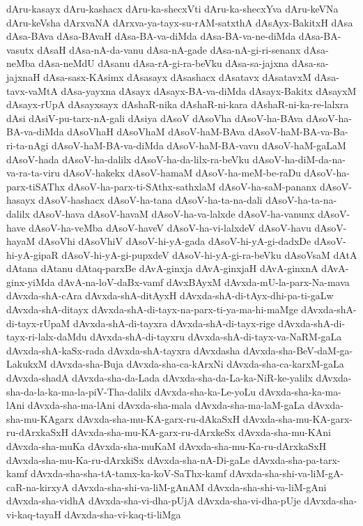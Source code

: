 {dAru-kasayx
dAru-kashacx
dAru-ka-shecxVti
dAru-ka-shecxYva
dAru-keVNa
dAru-keVsha
dArxvaNA
dArxva-ya-tayx-su-rAM-satxthA
dAsAyx-BakitxH
dAsa
dAsa-BAva
dAsa-BAvaH
dAsa-BA-va-diMda
dAsa-BA-va-ne-diMda
dAsa-BA-vasutx
dAsaH
dAsa-nA-da-vanu
dAsa-nA-gade
dAsa-nA-gi-ri-senanx
dAsa-neMba
dAsa-neMdU
dAsanu
dAsa-rA-gi-ra-beVku
dAsa-sa-jajxna
dAsa-sa-jajxnaH
dAsa-sasx-KAsimx
dAsasayx
dAsashacx
dAsatavx
dAsatavxM
dAsa-tavx-vaMtA
dAsa-yayxna
dAsayx
dAsayx-BA-va-diMda
dAsayx-Bakitx
dAsayxM
dAsayx-rUpA
dAsayxsayx
dAshaR-nika
dAshaR-ni-kara
dAshaR-ni-ka-re-lalxra
dAsi
dAsiV-pu-tarx-nA-gali
dAsiya
dAsoV
dAsoVha
dAsoV-ha-BAva
dAsoV-ha-BA-va-diMda
dAsoVhaH
dAsoVhaM
dAsoV-haM-BAva
dAsoV-haM-BA-va-Ba-ri-ta-nAgi
dAsoV-haM-BA-va-diMda
dAsoV-haM-BA-vavu
dAsoV-haM-gaLaM
dAsoV-hada
dAsoV-ha-dalilx
dAsoV-ha-da-lilx-ra-beVku
dAsoV-ha-diM-da-na-va-ra-ta-viru
dAsoV-hakekx
dAsoV-hamaM
dAsoV-ha-meM-be-raDu
dAsoV-ha-parx-tiSAThx
dAsoV-ha-parx-ti-SAthx-sathxlaM
dAsoV-ha-saM-pananx
dAsoV-hasayx
dAsoV-hashacx
dAsoV-ha-tana
dAsoV-ha-ta-na-dali
dAsoV-ha-ta-na-dalilx
dAsoV-hava
dAsoV-havaM
dAsoV-ha-va-lalxde
dAsoV-ha-vanunx
dAsoV-have
dAsoV-ha-veMba
dAsoV-haveV
dAsoV-ha-vi-lalxdeV
dAsoV-havu
dAsoV-hayaM
dAsoVhi
dAsoVhiV
dAsoV-hi-yA-gada
dAsoV-hi-yA-gi-dadxDe
dAsoV-hi-yA-gipaR
dAsoV-hi-yA-gi-pupxdeV
dAsoV-hi-yA-gi-ra-beVku
dAsoVsaM
dAtA
dAtana
dAtanu
dAtaq-parxBe
dAvA-ginxja
dAvA-ginxjaH
dAvA-ginxnA
dAvA-ginx-yiMda
dAvA-na-loV-daBx-vamf
dAvxBAyxM
dAvxda-mU-la-parx-Na-mava
dAvxda-shA-cAra
dAvxda-shA-ditAyxH
dAvxda-shA-di-tAyx-dhi-pa-ti-gaLw
dAvxda-shA-ditayx
dAvxda-shA-di-tayx-na-parx-ti-ya-ma-hi-maMge
dAvxda-shA-di-tayx-rUpaM
dAvxda-shA-di-tayxra
dAvxda-shA-di-tayx-rige
dAvxda-shA-di-tayx-ri-lalx-daMdu
dAvxda-shA-di-tayxru
dAvxda-shA-di-tayx-va-NaRM-gaLa
dAvxda-shA-kaSx-rada
dAvxda-shA-tayxra
dAvxdasha
dAvxda-sha-BeV-daM-ga-LakukxM
dAvxda-sha-Buja
dAvxda-sha-ca-kArxNi
dAvxda-sha-ca-karxM-gaLa
dAvxda-shadA
dAvxda-sha-da-Lada
dAvxda-sha-da-La-ka-NiR-ke-yalilx
dAvxda-sha-da-la-ka-ma-la-piV-Tha-dalilx
dAvxda-sha-ka-Le-yoLu
dAvxda-sha-ka-ma-lAni
dAvxda-sha-ma-lAni
dAvxda-sha-mala
dAvxda-sha-ma-laM-gaLa
dAvxda-sha-mu-KAgarx
dAvxda-sha-mu-KA-garx-ru-dAkaSxH
dAvxda-sha-mu-KA-garx-ru-dArxkaSxH
dAvxda-sha-mu-KA-garx-ru-dArxkeSx
dAvxda-sha-mu-KAni
dAvxda-sha-muKa
dAvxda-sha-muKaM
dAvxda-sha-mu-Ka-ru-dArxkaSxH
dAvxda-sha-mu-Ka-ru-dArxkiSx
dAvxda-sha-nA-Di-gaLe
dAvxda-sha-pa-tarx-kamf
dAvxda-sha-sha-tA-tamx-ka-koV-SaThx-kamf
dAvxda-sha-shi-va-liM-gA-caR-na-kirxyA
dAvxda-sha-shi-va-liM-gAnAM
dAvxda-sha-shi-va-liM-gAni
dAvxda-sha-vidhA
dAvxda-sha-vi-dha-pUjA
dAvxda-sha-vi-dha-pUje
dAvxda-sha-vi-kaq-tayaH
dAvxda-sha-vi-kaq-ti-liMga
}
